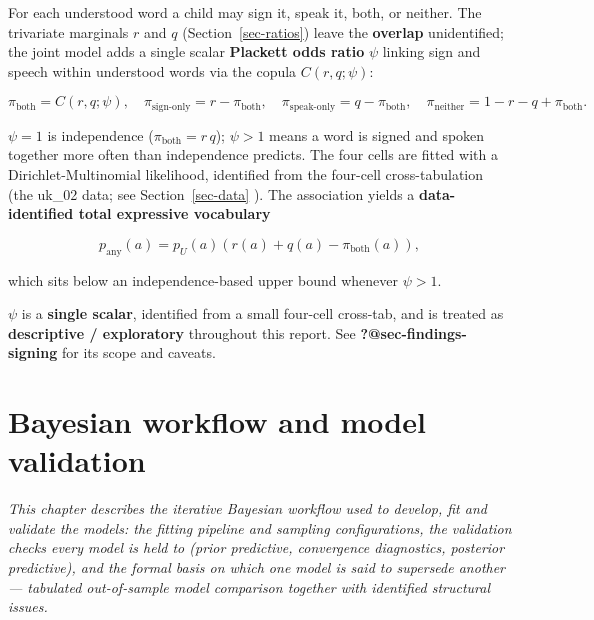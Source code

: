 \documentclass[
  11pt,
  a4paper,
]{report}
\begin{document}
For each understood word a child may sign it, speak it, both, or
neither. The trivariate marginals \(r\) and \(q\)
(Section~\ref{sec-ratios}) leave the \textbf{overlap} unidentified; the
joint model adds a single scalar \textbf{Plackett odds ratio} \(\psi\)
linking sign and speech within understood words via the copula
\(C(r, q; \psi)\):

\[
\pi_{\text{both}} = C(r, q; \psi),\quad
\pi_{\text{sign-only}} = r - \pi_{\text{both}},\quad
\pi_{\text{speak-only}} = q - \pi_{\text{both}},\quad
\pi_{\text{neither}} = 1 - r - q + \pi_{\text{both}} .
\]

\(\psi = 1\) is independence (\(\pi_{\text{both}} = r\,q\));
\(\psi > 1\) means a word is signed and spoken together more often than
independence predicts. The four cells are fitted with a
Dirichlet-Multinomial likelihood, identified from the four-cell
cross-tabulation (the uk\_02 data; see Section~\ref{sec-data} ). The
association yields a \textbf{data-identified total expressive
vocabulary}

\[
p_{\text{any}}(a) = p_U(a)\left(r(a) + q(a) - \pi_{\text{both}}(a)\right),
\]

which sits below an independence-based upper bound whenever
\(\psi > 1\).

\begin{tcolorbox}[enhanced jigsaw, arc=.35mm, bottomrule=.15mm, bottomtitle=1mm, breakable, colback=white, colbacktitle=quarto-callout-important-color!10!white, colframe=quarto-callout-important-color-frame, coltitle=black, left=2mm, leftrule=.75mm, opacityback=0, opacitybacktitle=0.6, rightrule=.15mm, title=\textcolor{quarto-callout-important-color}{\faExclamation}\hspace{0.5em}{Important}, titlerule=0mm, toprule=.15mm, toptitle=1mm]

\(\psi\) is a \textbf{single scalar}, identified from a small four-cell
cross-tab, and is treated as \textbf{descriptive / exploratory}
throughout this report. See \textbf{?@sec-findings-signing} for its
scope and caveats.

\end{tcolorbox}

\chapter{Bayesian workflow and model
validation}\label{bayesian-workflow-and-model-validation}

\emph{This chapter describes the iterative Bayesian workflow used to
develop, fit and validate the models: the fitting pipeline and sampling
configurations, the validation checks every model is held to (prior
predictive, convergence diagnostics, posterior predictive), and the
formal basis on which one model is said to supersede another ---
tabulated out-of-sample model comparison together with identified
structural issues.}
\end{document}
